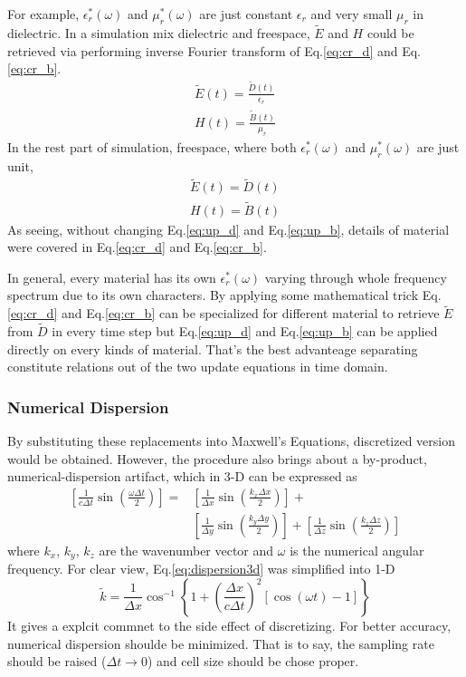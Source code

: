 For example, $\epsilon_r^*(\omega)$ and $\mu_r^*(\omega)$ are just constant $\epsilon_r$ and very small $\mu_r$ in
dielectric. In a simulation mix dielectric and freespace, $\widetilde{E}$ and $H$ could be retrieved via performing
inverse Fourier transform of Eq.\ref{eq:cr_d} and Eq.\ref{eq:cr_b}.
\begin{gather*}
  \widetilde{E}(t) = \frac{\widetilde{D}(t)}{\epsilon_r}\\
  H(t) = \frac{\widetilde{B}(t)}{\mu_r}
\end{gather*}
In the rest part of simulation, freespace, where both $\epsilon_r^*(\omega)$ and $\mu_r^*(\omega)$ are just unit, 
\begin{gather*}
  \widetilde{E}(t) = \widetilde{D}(t)\\
  H(t) = \widetilde{B}(t)
\end{gather*}
As seeing, without changing Eq.\ref{eq:up_d} and Eq.\ref{eq:up_b}, details of material were covered in Eq.\ref{eq:cr_d}
and Eq.\ref{eq:cr_b}.

In general, every material has its own $\epsilon_r^*(\omega)$ varying through whole frequency spectrum due to its own
characters. By applying some mathematical trick Eq.\ref{eq:cr_d} and Eq.\ref{eq:cr_b} can be specialized for different
material to retrieve $\widetilde{E}$ from $\widetilde{D}$ in every time step but Eq.\ref{eq:up_d} and Eq.\ref{eq:up_b}
can be applied directly on every kinds of material. That's the best advanteage separating constitute relations out of
the two update equations in time domain.

\subsubsection{Numerical Dispersion}
By substituting these replacements into Maxwell's Equations, discretized version would be obtained. However, the
procedure also brings about a by-product, numerical-dispersion artifact, which in 3-D can be expressed as
\begin{equation}
  \label{eq:dispersion3d}
  \begin{split}
    \left[\frac{1}{c\Delta t}\sin\left(\frac{\omega\Delta t}{2}\right)\right] = &
    \left[\frac{1}{\Delta x}\sin\left(\frac{k_x\Delta x}{2}\right)\right] + \\ &
    \left[\frac{1}{\Delta y}\sin\left(\frac{k_y\Delta y}{2}\right)\right] +
    \left[\frac{1}{\Delta z}\sin\left(\frac{k_z\Delta z}{2}\right)\right]
  \end{split}
\end{equation}
where $k_x$, $k_y$, $k_z$ are the wavenumber vector and $\omega$ is the numerical angular frequency. For clear view,
Eq.\ref{eq:dispersion3d} was simplified into 1-D
\begin{equation}
  \widetilde{k} = \frac{1}{\Delta x} \cos^{-1} \left\{1+\left(\frac{\Delta x}{c\Delta t}\right)^2\left[\cos(\omega t)-1\right]\right\}
\end{equation}
It gives a explcit commnet to the side effect of discretizing. For better accuracy, numerical dispersion shoulde be
minimized. That is to say, the sampling rate should be raised ($\Delta t \rightarrow 0$) and cell size should be chose
proper. \cite[Taflove 2005]{taflove}


